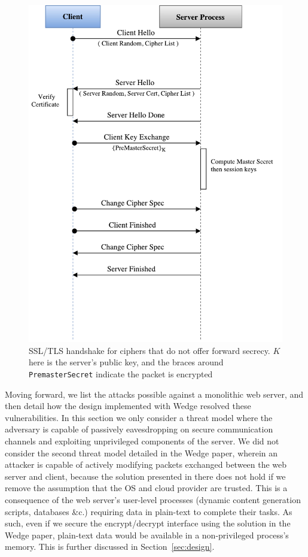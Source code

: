 \documentclass[../main.tex]{subfiles}
\begin{document}
\begin{figure}[H]
  \centering
  \includegraphics[scale=0.4]{images/rsa-handshake-pristine.pdf}
  \caption[SSL/TLS ``RSA'' handshake]{SSL/TLS handshake for ciphers
    that do not offer forward secrecy. $K$ here is the server's public
    key, and the braces around \texttt{PremasterSecret} indicate the
    packet is encrypted}
  \label{fig:pristrsashake}
\end{figure}

Moving forward, we list the attacks possible against a monolithic web
server, and then detail how the design implemented with Wedge resolved
these vulnerabilities. In this section we only consider a threat
model where the adversary is capable of passively eavesdropping on
secure communication channels and exploiting unprivileged components
of the server. We did not consider the second threat model detailed in
the Wedge paper, wherein an attacker is capable of actively modifying
packets exchanged between the web server and client, because the
solution presented in there does not hold if we remove the assumption
that the OS and cloud provider are trusted. This is a consequence of
the web server's user-level processes (dynamic content generation
scripts, databases \&c.)  requiring data in plain-text to complete
their tasks. As such, even if we secure the encrypt/decrypt interface
using the solution in the Wedge paper, plain-text data would
be available in a non-privileged process's memory. This is further
discussed in Section~\ref{sec:design}.
\end{document}
